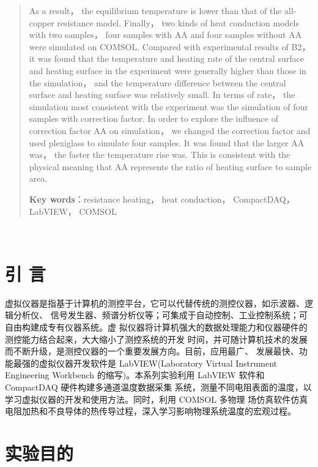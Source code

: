 \documentclass[10pt,a4paper,twoside,UTF8]{ctexart}
\begin{document}
\begin{abstract}
{		As a result， the equilibrium temperature is lower than that of the all-copper resistance model.
		Finally， two kinds of heat conduction models with two samples， four samples with AA and four samples without AA were simulated on COMSOL. 
		Compared with experimental results of B2， it was found that the temperature and heating rate of the central surface and heating surface in the experiment were generally higher than those in the simulation，
		 and the temperature difference between the central surface and heating surface was relatively small.  
		In terms of rate， the simulation most consistent with the experiment was the simulation of four samples with correction factor.
		In order to explore the influence of correction factor AA on simulation， we changed the correction factor and used plexiglass to simulate four samples. It was found that the larger AA was， the faster the temperature rise was. 
		 This is consistent with the physical meaning that AA represents the ratio of heating surface to sample area.
		}
		\par		
		\textbf{Key words}：resistance heating， heat conduction， CompactDAQ， LabVIEW， COMSOL
	\end{abstract}
	~\\





\section{引 \quad 言}

虚拟仪器是指基于计算机的测控平台，它可以代替传统的测控仪器，如示波器、逻辑分析仪、
信号发生器、频谱分析仪等；可集成于自动控制、工业控制系统；可自由构建成专有仪器系统。虚
拟仪器将计算机强大的数据处理能力和仪器硬件的测控能力结合起来，大大缩小了测控系统的开发
时间，并可随计算机技术的发展而不断升级，是测控仪器的一个重要发展方向。目前，应用最广、
发展最快、功能最强的虚拟仪器开发软件是 LabVIEW(Laboratory Virtual Instrument Engineering 
Workbench 的缩写)。本系列实验利用 LabVIEW 软件和 CompactDAQ 硬件构建多通道温度数据采集
系统，测量不同电阻表面的温度，以学习虚拟仪器的开发和使用方法。同时，利用 COMSOL 多物理
场仿真软件仿真电阻加热和不良导体的热传导过程，深入学习影响物理系统温度的宏观过程。

\section{实验目的}
\end{document}

